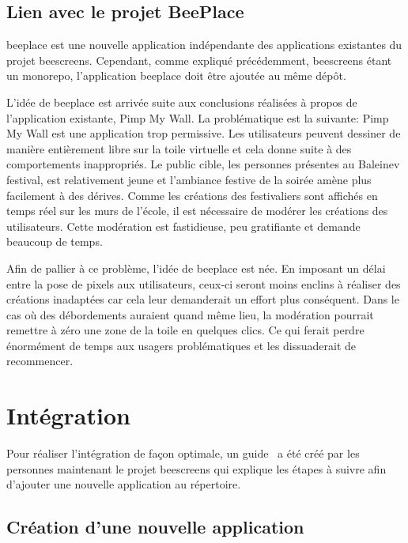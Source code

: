 
\subsection{Lien avec le projet BeePlace}
\label{sec:lien-avec-le-projet-beeplace}

\gls{beeplace} est une nouvelle application indépendante des applications existantes du projet \gls{beescreens}. Cependant, comme expliqué précédemment, \gls{beescreens} étant un monorepo, l'application \gls{beeplace} doit être ajoutée au même dépôt.

L'idée de \gls{beeplace} est arrivée suite aux conclusions réalisées à propos de l'application existante, Pimp My Wall. La problématique est la suivante: Pimp My Wall est une application trop permissive. Les utilisateurs peuvent dessiner de manière entièrement libre sur la toile virtuelle et cela donne suite à des comportements inappropriés. Le public cible, les personnes présentes au Baleinev festival, est relativement jeune et l'ambiance festive de la soirée amène plus facilement à des dérives. Comme les créations des festivaliers sont affichés en temps réel sur les murs de l'école, il est nécessaire de modérer les créations des utilisateurs. Cette modération est fastidieuse, peu gratifiante et demande beaucoup de temps.

Afin de pallier à ce problème, l'idée de \gls{beeplace} est née. En imposant un délai entre la pose de pixels aux utilisateurs, ceux-ci seront moins enclins à réaliser des créations inadaptées car cela leur demanderait un effort plus conséquent. Dans le cas où des débordements auraient quand même lieu, la modération pourrait remettre à zéro une zone de la toile en quelques clics. Ce qui ferait perdre énormément de temps aux usagers problématiques et les dissuaderait de recommencer.

\section{Intégration}

Pour réaliser l'intégration de façon optimale, un guide~\cite{addapptobeescreens} a été créé par les personnes maintenant le projet \gls{beescreens} qui explique les étapes à suivre afin d'ajouter une nouvelle application au répertoire.

\subsection{Création d'une nouvelle application}

